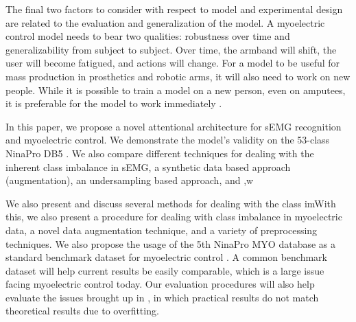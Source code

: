 \documentclass{llncs}
\begin{document}
The final two factors to consider with respect to model and experimental design are related to the evaluation and generalization of the model. A myoelectric control model needs to bear two qualities: robustness over time and generalizability from subject to subject. Over time, the armband will shift, the user will become fatigued, and actions will change. For a model to be useful for mass production in prosthetics and robotic arms, it will also need to work on new people. While it is possible to train a model on a new person, even on amputees, it is preferable for the model to work immediately \cite{amputeedb}.


In this paper, we propose a novel attentional architecture for sEMG recognition and myoelectric control. We demonstrate the model's validity on the 53-class NinaPro DB5 \cite{nina5}. We also compare different techniques  for dealing with the inherent class imbalance in sEMG, a synthetic data based approach (augmentation), an undersampling based approach, and ,w

We also present and discuss several methods for dealing with the class imWith this, we also present a procedure for dealing with class imbalance in myoelectric data, a novel data augmentation technique, and a variety of preprocessing techniques. We also propose the usage of the 5th NinaPro MYO database as a standard benchmark dataset for myoelectric control \cite{nina5}. A common benchmark dataset will help current results be easily comparable, which is a large issue facing myoelectric control today. Our evaluation procedures will also help evaluate the issues brought up in \cite{systematic}, in which practical results do not match theoretical results due to overfitting.  %
\end{document}
